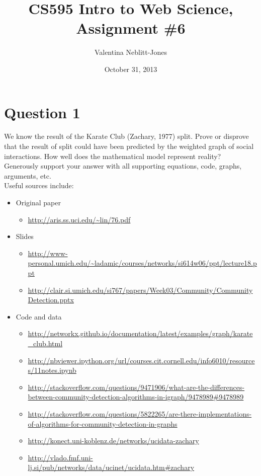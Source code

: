 \documentclass{article}
\begin{document}
\title{CS595 Intro to Web Science, Assignment \#6}
\author{Valentina Neblitt-Jones}
\date{October 31, 2013}
\maketitle



\section*{Question 1}

We know the result of the Karate Club (Zachary, 1977) split. Prove or disprove that the result of split could have been predicted by the weighted graph of social interactions. How well does the mathematical model represent reality? \\

Generously support your answer with all supporting equations, code, graphs, arguments, etc. \\

Useful sources include:  \\

\begin{itemize}
\item Original paper
	\begin{itemize}
	\item \url{http://aris.ss.uci.edu/~lin/76.pdf}
	\end{itemize}
\item Slides 
	\begin{itemize}
	\item \url{http://www-personal.umich.edu/~ladamic/courses/networks/si614w06/ppt/lecture18.ppt}
	\item \url{http://clair.si.umich.edu/si767/papers/Week03/Community/CommunityDetection.pptx}
	\end{itemize}
\item{Code and data}
	\begin{itemize}
	\item \url{http://networkx.github.io/documentation/latest/examples/graph/karate_club.html}
	\item \url{http://nbviewer.ipython.org/url/courses.cit.cornell.edu/info6010/resources/11notes.ipynb}
	\item \url{http://stackoverflow.com/questions/9471906/what-are-the-differences-between-community-detection-algorithms-in-igraph/9478989#9478989}
	\item \url{http://stackoverflow.com/questions/5822265/are-there-implementations-of-algorithms-for-community-detection-in-graphs}
	\item \url{http://konect.uni-koblenz.de/networks/ucidata-zachary}
	\item \url{http://vlado.fmf.uni-lj.si/pub/networks/data/ucinet/ucidata.htm#zachary}
	\end{itemize}
\end{itemize}
\end{document}
